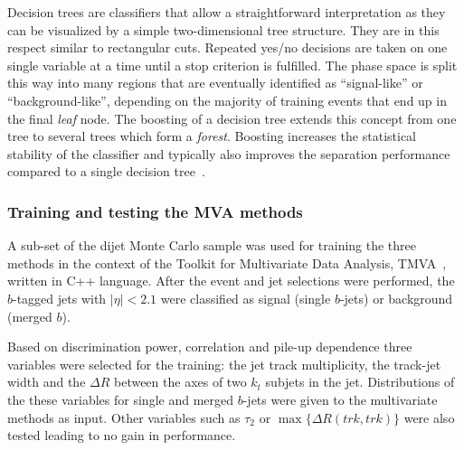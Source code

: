 Decision trees %
are classifiers that allow a straightforward interpretation as they can be visualized by a simple two-dimensional tree structure. They are in this respect similar to rectangular cuts. 
Repeated yes/no decisions are taken on one single variable at a time until a stop criterion is fulfilled.  The phase space is split this way into many regions that are eventually identified as ``signal-like'' or ``background-like'', depending on the majority of training events that end up in the final \emph{leaf} node. The boosting of a decision tree extends this concept from one tree to several trees which form a \emph{forest}.
Boosting increases the statistical stability of the classifier and typically also improves the separation performance compared to a single decision tree~\cite{QUINLAN1999497}. %


\subsubsection{Training and testing the MVA methods}

A sub-set of the dijet Monte Carlo sample was used for training the three methods in the context of the Toolkit for Multivariate Data Analysis, TMVA~\cite{Hocker:2007ht}, written in C++ language.  After the event and jet selections were performed, the $b$-tagged jets with $|\eta| < 2.1$ were classified as signal (single $b$-jets) or background (merged $b$). 

Based on discrimination power, correlation and pile-up dependence three variables were selected for the training: the jet track multiplicity, the track-jet width and the $\Delta R$ between the axes of two $k_t$ subjets in the jet.  Distributions of the these variables for single and merged $b$-jets were given to the multivariate methods as input. Other variables such as $\tau_2$ or $\max\{\Delta R(trk,trk)\}$ were also tested leading to no gain in performance.

